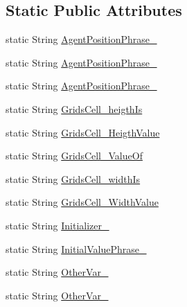 \subsection*{Static Public Attributes}
\begin{DoxyCompactItemize}
\item 
static String \hyperlink{classit_1_1isislab_1_1masonassisteddocumentation_1_1mason_1_1wizards_1_1_messages_afc9afd4a5b322755a35fa12157855cce}{Agent\-Position\-Phrase\-\_}
\item 
static String \hyperlink{classit_1_1isislab_1_1masonassisteddocumentation_1_1mason_1_1wizards_1_1_messages_a4249c0cd1a57fe129d7a63bb59ff8bef}{Agent\-Position\-Phrase\-\_}
\item 
static String \hyperlink{classit_1_1isislab_1_1masonassisteddocumentation_1_1mason_1_1wizards_1_1_messages_add8a0a6b873ec534449be8d0582e4ee9}{Agent\-Position\-Phrase\-\_}
\item 
static String \hyperlink{classit_1_1isislab_1_1masonassisteddocumentation_1_1mason_1_1wizards_1_1_messages_a16a8b04a6fdd851e2c7cd2446f762c03}{Grids\-Cell\-\_\-heigth\-Is}
\item 
static String \hyperlink{classit_1_1isislab_1_1masonassisteddocumentation_1_1mason_1_1wizards_1_1_messages_af1c71f95891af2b0ffc7b7fdd2a1cb4a}{Grids\-Cell\-\_\-\-Heigth\-Value}
\item 
static String \hyperlink{classit_1_1isislab_1_1masonassisteddocumentation_1_1mason_1_1wizards_1_1_messages_a54f4ffc24709abf1400fa83590e153bf}{Grids\-Cell\-\_\-\-Value\-Of}
\item 
static String \hyperlink{classit_1_1isislab_1_1masonassisteddocumentation_1_1mason_1_1wizards_1_1_messages_ae76ccd11919a92f8b436f11e2d02fd4c}{Grids\-Cell\-\_\-width\-Is}
\item 
static String \hyperlink{classit_1_1isislab_1_1masonassisteddocumentation_1_1mason_1_1wizards_1_1_messages_a28c24aac2f0cf24d058b8f9ba9c0438b}{Grids\-Cell\-\_\-\-Width\-Value}
\item 
static String \hyperlink{classit_1_1isislab_1_1masonassisteddocumentation_1_1mason_1_1wizards_1_1_messages_a25a68eb15e8c78cb887368b228480cd4}{Initializer\-\_}
\item 
static String \hyperlink{classit_1_1isislab_1_1masonassisteddocumentation_1_1mason_1_1wizards_1_1_messages_a7d03afb112d4ad63aeeb1dbea1d442db}{Initial\-Value\-Phrase\-\_}
\item 
static String \hyperlink{classit_1_1isislab_1_1masonassisteddocumentation_1_1mason_1_1wizards_1_1_messages_a33fa65074717cd5d7cefa93e9d3925cb}{Other\-Var\-\_}
\item 
static String \hyperlink{classit_1_1isislab_1_1masonassisteddocumentation_1_1mason_1_1wizards_1_1_messages_a9255ef313728c488d2c588c3b958d898}{Other\-Var\-\_}
\end{DoxyCompactItemize}
